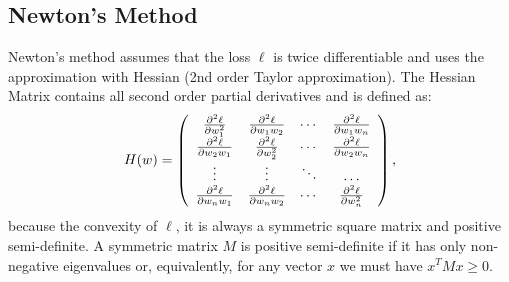 \subsection{Newton's Method}
\FloatBarrier
Newton's method assumes that the loss $\ell$ is twice differentiable and uses the approximation 
with Hessian (2nd order Taylor approximation).
The Hessian Matrix contains all second order partial derivatives and is defined as:
\begin{equation}
	\label{equ:hessian}
	H(w) = \left( \begin{array}{c c c c}
		\frac{\partial^{2}\ell}{\partial w_{1}^{2}}&
		\frac{\partial^{2}\ell}{\partial w_{1}w_{2}}& \cdots&
		\frac{\partial^{2}\ell}{\partial w_{1}w_{n}}\\

		\frac{\partial^{2}\ell}{\partial w_{2}w_{1}}&
		\frac{\partial^{2}\ell}{\partial w_{2}^{2}}& \cdots&
		\frac{\partial^{2}\ell}{\partial w_{2}w_{n}}\\

		\vdots& \vdots& \ddots& \hdots\\

		\frac{\partial^{2}\ell}{\partial w_{n}w_{1}}&
		\frac{\partial^{2}\ell}{\partial w_{n}w_{2}}& \cdots&
		\frac{\partial^{2}\ell}{\partial w_{n}^{2}}\\
	\end{array} \right),
\end{equation}
because the convexity of $\ell$, it is always a symmetric square matrix and positive
semi-definite. 
A symmetric matrix $M$ is positive semi-definite if it has only non-negative eigenvalues or, 
equivalently, for any vector $x$ we must have $x^{T}Mx\geq 0$.

